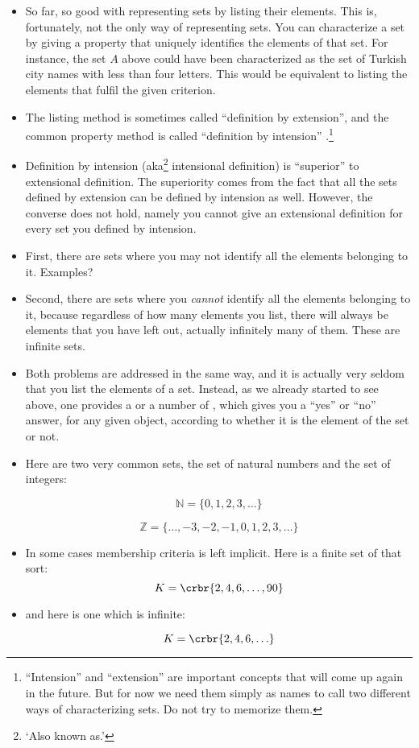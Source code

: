 \documentclass[11pt]{article}
\begin{document}
\begin{itemize}
\item So far, so good with representing sets by listing their elements.
This is, fortunately, not the only way of representing sets. You can
characterize a set by giving a property that uniquely identifies the elements of
that set. For instance, the set $A$ above could have been characterized as the
set of Turkish city names with less than
four letters. This would be equivalent to listing the elements that fulfil the
given criterion.

\item The listing method is sometimes called ``definition by
extension'', and the common property method is called ``definition by
intension'' .\footnote{``Intension'' and ``extension'' are
important concepts that will come up again in the future. But for now we need
them simply as names to call two different ways of characterizing sets. Do not
try to memorize them.}

\item Definition by intension (aka\footnote{`Also known as.'} intensional definition) is ``superior'' to
extensional definition. The superiority comes from the fact that all the sets
defined by extension can be defined by intension as well. However, the converse
does not hold, namely you cannot give an extensional definition for every set
you defined by intension.

\item[] First, there are sets where you may not identify all the elements
belonging to it. Examples?

\item[] Second, there are sets where you \emph{cannot} identify all the
elements belonging to it, because regardless of how many elements you
list, there will always be elements that you have left out, actually infinitely
many of them. These are infinite sets.

\item Both problems are addressed in the same way, and it is actually very
seldom that you list the elements of a set. Instead, as we already started to
see above, one provides a  or a number of
, which gives you a ``yes'' or ``no'' answer, for any
given object, according to whether it is the element of the set or not.

\item[]Here are two very common  sets, the set of natural numbers and the set of integers:


\[
\mathbb{N} = \{0,1,2,3,\ldots\}
\]

\[
\mathbb{Z} = \{\ldots,-3,-2,-1,0,1,2,3,\ldots\}
\]

\item In some cases membership criteria is left implicit. 
Here is a finite set of that sort:
\[
K = \crbr{2,4,6,\ldots,90}
\]

\item[]and here is one which is infinite:

\[
K = \crbr{2,4,6,\ldots}
\]

\end{itemize}
\end{document}
